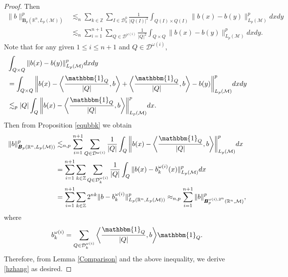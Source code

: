 \documentclass[oneside,english,a4wide]{amsart}
\numberwithin{equation}{section}
\numberwithin{figure}{section}
\theoremstyle{plain}
\theoremstyle{plain}
\theoremstyle{definition}
\theoremstyle{plain}
\theoremstyle{remark}
\theoremstyle{definition}
\theoremstyle{remark}
\theoremstyle{definition}
\newcommand{\8}{\infty}
\begin{document}
\begin{proof}
	Then
	\begin{equation*}
		\begin{aligned}
			\|b\|^p_{\pmb{B}_p(\mathbb{R}^n,L_p(\mathcal{M}))}{}&
			\lesssim_n \sum_{k\in \mathbb{Z}}\sum_{I\in \mathcal{D}^0_k}\frac{1}{|Q(I)|^2}\int_{Q(I)\times Q(I)} \|b(x)-b(y)\|^p_{L_p(\mathcal{M})}dxdy\\
			&\lesssim_n\sum_{i=1}^{n+1}\sum_{Q\in \mathcal{D}^{\omega(i)}}\frac{1}{|Q|^2}\int_{Q\times Q} \|b(x)-b(y)\|^p_{L_p(\mathcal{M})}dxdy.
		\end{aligned}
	\end{equation*}
	Note that for any given $1\le i\le n+1$ and $Q\in \mathcal{D}^{\omega(i)}$,
	\begin{equation*}
		\begin{aligned}
			  {}&\int_{Q\times Q} \|b(x)-b(y)\|^p_{L_p(\mathcal{M})}dxdy\\
			  &=\int_{Q\times Q} \bigg\|b(x)-\bigg\langle \frac{\mathbbm{1}_Q}{|Q|},b\bigg\rangle+\bigg\langle \frac{\mathbbm{1}_Q}{|Q|},b\bigg\rangle-b(y)\bigg\|^p_{L_p(\mathcal{M})}dxdy\\
			  &\lesssim_p |Q|\int_{Q} \bigg\|b(x)-\bigg\langle \frac{\mathbbm{1}_Q}{|Q|},b\bigg\rangle\bigg\|^p_{L_p(\mathcal{M})}dx.
		\end{aligned}
	\end{equation*}
	Then from Proposition \ref{equbbk} we obtain
	\begin{equation*}
		\begin{aligned}
			\|b\|^p_{\pmb{B}_p(\mathbb{R}^n,L_p(\mathcal{M}))}
			&\lesssim_{n,p} \sum_{i=1}^{n+1}\sum_{Q\in \mathcal{D}^{\omega(i)}}\frac{1}{|Q|}\int_{Q} \bigg\|b(x)-\bigg\langle \frac{\mathbbm{1}_Q}{|Q|},b\bigg\rangle\bigg\|^p_{L_p(\mathcal{M})}dx\\
			&=\sum_{i=1}^{n+1}\sum_{k\in\mathbb{Z}}\sum_{Q\in \mathcal{D}_k^{\omega(i)}}\frac{1}{|Q|}\int_{Q} \|b(x)-b_k^{\omega(i)}(x)\|^p_{L_p(\mathcal{M})}dx\\
			&=\sum_{i=1}^{n+1}\sum_{k\in\mathbb{Z}} 2^{nk}\|b-b_k^{\omega(i)}\|^p_{L_p(\mathbb{R}^n,L_p(\mathcal{M}))}\approx_{n,p} \sum_{i=1}^{n+1}\|b\|^p_{\pmb{B}_p^{\omega(i),2^n}(\mathbb{R}^n,\mathcal{M})},
		\end{aligned}
	\end{equation*}
where $$b_k^{\omega(i)}=\sum_{Q\in\mathcal{D}_k^{\omega(i)}}\bigg\langle \frac{\mathbbm{1}_Q}{|Q|},b\bigg\rangle \mathbbm{1}_Q.$$
Therefore, from Lemma \ref{Comparison} and the above inequality, we derive \eqref{hzhang} as desired.
\end{proof}
\end{document}
